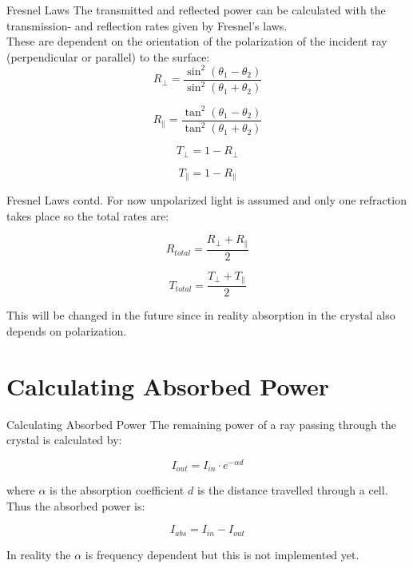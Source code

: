 \documentclass[aspectratio=43,t]{beamer}
\begin{document}
		\begin{frame}[fragile]{Fresnel Laws}
		The transmitted and reflected power can be calculated with the transmission- and 
			reflection rates given by Fresnel's laws.\\
			These are dependent on the orientation of the polarization of the incident
			ray (perpendicular or parallel) to the surface:\\

		\begin{equation*}
			R_{\perp} = \frac{\sin^2(\theta_1 - \theta_2)}{\sin^2(\theta_1 + \theta_2)}
		\end{equation*}

		\begin{equation*}
			R_{\parallel} = \frac{\tan^2(\theta_1 - \theta_2)}{\tan^2(\theta_1 + \theta_2)}
		\end{equation*}

		\begin{equation*}
			T_{\perp} = 1 - R_{\perp}
		\end{equation*}

		\begin{equation*}
			T_{\parallel} = 1 - R_{\parallel}
		\end{equation*}
    \end{frame}

		\begin{frame}[fragile]{Fresnel Laws contd.}
		For now unpolarized light is assumed and only one refraction takes place so the total
		rates are:

		\begin{equation*}
			R_{total} = \frac{R_{\perp} + R_{\parallel}}{2}
		\end{equation*}

		\begin{equation*}
			T_{total} = \frac{T_{\perp} + T_{\parallel}}{2}
		\end{equation*}

		This will be changed in the future since in reality absorption in the crystal also
		depends on polarization.
    \end{frame}

	\section{Calculating Absorbed Power}
		\begin{frame}[fragile]{Calculating Absorbed Power}
			The remaining power of a ray passing through the crystal is calculated by:

			\begin{equation*}
				I_{out} = I_{in} \cdot e^{-\alpha d}
			\end{equation*}

			where $\alpha$ is the absorption coefficient $d$ is the distance travelled
			through a cell.\\
			Thus the absorbed power is:

			\begin{equation*}
				I_{abs} = I_{in} - I_{out}
			\end{equation*}

			In reality the $\alpha$ is frequency dependent but this is not implemented yet.
    \end{frame}
\end{document}
